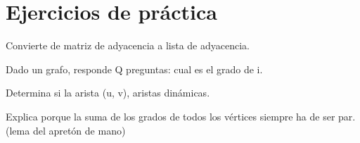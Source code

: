 
\section{Ejercicios de práctica}

\begin{exercise}
	Convierte de matriz de adyacencia a lista de adyacencia.
\end{exercise}

\begin{exercise}
	Dado un grafo, responde Q preguntas: cual es el grado de i.
\end{exercise}

\begin{exercise}
	Determina si la arista (u, v), aristas dinámicas.
\end{exercise}

\begin{exercise}
	Explica porque la suma de los grados de todos los vértices siempre ha de ser par. (lema del apretón de mano)
\end{exercise}
